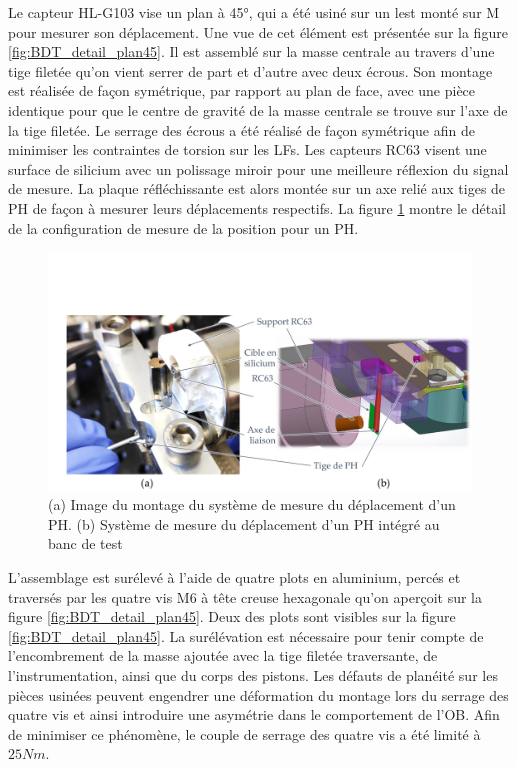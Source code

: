 Le capteur HL-G103 vise un plan à 45°, qui a été usiné sur un lest monté sur M pour mesurer son déplacement. Une vue de cet élément est présentée sur la figure \ref{fig:BDT_detail_plan45}. Il est assemblé sur la masse centrale au travers d'une tige filetée qu'on vient serrer de part et d'autre avec deux écrous. Son montage est réalisée de façon symétrique, par rapport au plan de face, avec une pièce identique pour que le centre de gravité de la masse centrale se trouve sur l'axe de la tige filetée. Le serrage des écrous a été réalisé de façon symétrique afin de minimiser les contraintes de torsion sur les LFs. Les capteurs RC63 visent une surface de silicium avec un polissage miroir pour une meilleure réflexion du signal de mesure. La plaque réfléchissante est alors montée sur un axe relié aux tiges de PH de façon à mesurer leurs déplacements respectifs. La figure \ref{fig:BDT_detail_capteur_RC63} montre le détail de la configuration de mesure de la position pour un PH.
\begin{figure}[!htbp]
\begin{center}
    \captionsetup{justification=centering}
	\includegraphics[trim={1.5cm 0cm 0cm 3cm},clip, width=\textwidth]{../Chap3/Figure/BDT_detail_capteur_RC63_2.pdf}
	\caption{(a) Image du montage du système de mesure du déplacement d'un PH. (b) Système de mesure du déplacement d'un PH intégré au banc de test}
	\label{fig:BDT_detail_capteur_RC63}
\end{center}
\end{figure}

L'assemblage est surélevé à l'aide de quatre plots en aluminium, percés et traversés par les quatre vis M6 à tête creuse hexagonale qu'on aperçoit sur la figure \ref{fig:BDT_detail_plan45}. Deux des plots sont visibles sur la figure \ref{fig:BDT_detail_plan45}. La surélévation est nécessaire pour tenir compte de l'encombrement de la masse ajoutée avec la tige filetée traversante, de  l'instrumentation, ainsi que du corps des pistons. Les défauts de planéité sur les pièces usinées peuvent engendrer une déformation du montage lors du serrage des quatre vis et ainsi introduire une asymétrie dans le comportement de l'OB. Afin de minimiser ce phénomène, le couple de serrage des quatre vis a été limité à $25Nm$.

